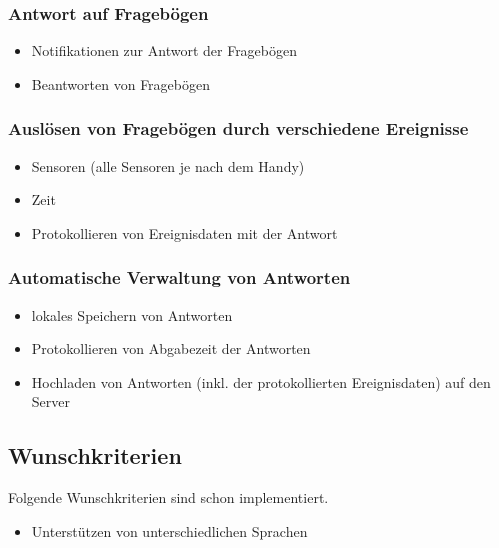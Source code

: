 \documentclass[a4paper]{scrreprt}
\begin{document}
                \subsubsection{Antwort auf Frageb\"ogen}
                    \begin{itemize}
                        \item Notifikationen zur Antwort der Frageb\"ogen
                        \item Beantworten von Frageb\"ogen
                    \end{itemize}
                \subsubsection{Auslösen von Frageb\"ogen durch verschiedene Ereignisse}
                    \begin{itemize}
                        \item Sensoren (alle Sensoren je nach dem Handy)
                        \item Zeit
                        \item Protokollieren von Ereignisdaten mit der Antwort
                    \end{itemize}
                \subsubsection{Automatische Verwaltung von Antworten}
                    \begin{itemize}
                        \item lokales Speichern von Antworten
                        \item Protokollieren von Abgabezeit der Antworten
                        \item Hochladen von Antworten (inkl. der protokollierten Ereignisdaten) auf den Server
                    \end{itemize}
                \vspace*{0.5cm}
        \subsection{Wunschkriterien}
        \par
        Folgende Wunschkriterien sind schon implementiert.
                \begin{itemize}
                    \item Unterst\"utzen von unterschiedlichen Sprachen
                \end{itemize}
                \vspace*{0.5cm}
\end{document}
